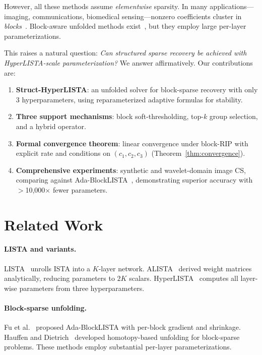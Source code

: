 \documentclass{article}
\begin{document}
However, all these methods assume \emph{elementwise} sparsity. In many applications---imaging, communications, biomedical sensing---nonzero coefficients cluster in \emph{blocks}~\cite{baraniuk2010model,eldar2010block}. Block-aware unfolded methods exist~\cite{fu2021adablocklista,hauffen2022blockunfolding}, but they employ large per-layer parameterizations.

This raises a natural question: \emph{Can structured sparse recovery be achieved with HyperLISTA-scale parameterization?} We answer affirmatively. Our contributions are:
\begin{enumerate}
    \item \textbf{Struct-HyperLISTA}: an unfolded solver for block-sparse recovery with only 3 hyperparameters, using reparameterized adaptive formulas for stability.
    \item \textbf{Three support mechanisms}: block soft-thresholding, top-$k$ group selection, and a hybrid operator.
    \item \textbf{Formal convergence theorem}: linear convergence under block-RIP with explicit rate and conditions on $(c_1, c_2, c_3)$ (Theorem~\ref{thm:convergence}).
    \item \textbf{Comprehensive experiments}: synthetic and wavelet-domain image CS, comparing against Ada-BlockLISTA~\cite{fu2021adablocklista}, demonstrating superior accuracy with $>$10,000$\times$ fewer parameters.
\end{enumerate}


\section{Related Work}

\paragraph{LISTA and variants.} LISTA~\cite{gregor2010lista} unrolls ISTA into a $K$-layer network. ALISTA~\cite{liu2019alista} derived weight matrices analytically, reducing parameters to $2K$ scalars. HyperLISTA~\cite{chen2021hyperlista} computes all layer-wise parameters from three hyperparameters.

\paragraph{Block-sparse unfolding.} Fu et al.~\cite{fu2021adablocklista} proposed Ada-BlockLISTA with per-block gradient and shrinkage. Hauffen and Dietrich~\cite{hauffen2022blockunfolding} developed homotopy-based unfolding for block-sparse problems. These methods employ substantial per-layer parameterizations.
\end{document}
